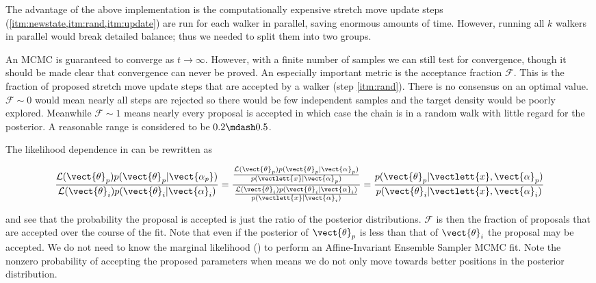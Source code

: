The advantage of the above implementation is the computationally expensive stretch move update steps
(\cref{itm:newstate,itm:rand,itm:update}) are run
for each walker in parallel, saving enormous amounts of time.  However, running all $k$ walkers in parallel would break detailed balance;
thus we needed to split them into two groups.

An MCMC is guaranteed to converge as $t \rightarrow \infty$.  However, with a finite number of samples we can still test for convergence,
though it should be made clear that convergence can never be proved.  An especially important metric is the acceptance fraction
$\mathcal{F}$.  This is the fraction of proposed stretch move update steps that are accepted by a walker (step \cref{itm:rand}).  There is
no consensus on an optimal value.  $\mathcal{F} \sim 0$ would mean nearly all steps are rejected so there would be few independent samples
and the target density would be poorly explored.  Meanwhile $\mathcal{F} \sim 1$ means nearly every proposal is accepted in which case
the chain is in a random walk with little regard for the posterior.  A reasonable range is considered to be $0.2 \mdash 0.5$.

The likelihood dependence in  can be rewritten as

\begin{equation}
\frac{\mathcal{L}(\vect{\theta}_p) p(\vect{\theta}_p|\vect{\alpha_p})}
{\mathcal{L}(\vect{\theta}_i) p(\vect{\theta}_i|\vect{\alpha}_i)} =
\dfrac{\frac{\mathcal{L}(\vect{\theta}_p) p(\vect{\theta}_p|\vect{\alpha}_p)}{p(\vectlett{x}|\vect{\alpha}_p)}}
{\frac{\mathcal{L}(\vect{\theta}_i) p(\vect{\theta}_i|\vect{\alpha}_i)}{p(\vectlett{x}|\vect{\alpha}_i)}} =
\frac{p(\vect{\theta}_p|\vectlett{x}, \vect{\alpha}_p)}{p(\vect{\theta}_i|\vectlett{x}, \vect{\alpha}_i)}
\label{eq:er_nr_calibrations_parameter_determ_mcmc_acc_ratio}
\end{equation}

\noindent and see that the probability the proposal is accepted is just the ratio of the posterior distributions.  $\mathcal{F}$ is then
the fraction of proposals that are accepted over the course of the fit.  Note that even if the posterior of $\vect{\theta}_p$ is less than
that of $\vect{\theta}_i$ the proposal may be accepted.  We do not need to know the marginal
likelihood () to perform an Affine-Invariant Ensemble Sampler MCMC
fit.  Note the nonzero probability of accepting the
proposed parameters when  means we do not only move towards better positions in the posterior distribution.


